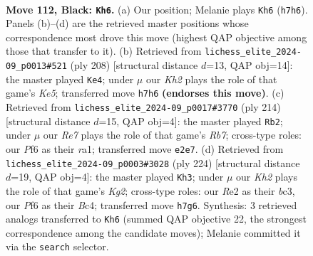 \documentclass[11pt]{article}
\begin{document}
\clearpage

\begin{figure}[p]\centering
\begin{subfigure}{0.46\textwidth}\centering
\resizebox{\linewidth}{!}{%
\newchessgame
\chessboard[
  setfen={8/6pk/5p2/R6p/N6P/6PK/4r3/8 b - - 49 112},
  showmover=false,
  pgfstyle=straightmove, color=movearrow, markmove={h7-h6}
]}
\caption{}
\end{subfigure}\hfill
\begin{subfigure}{0.46\textwidth}\centering
\resizebox{\linewidth}{!}{%
\newchessgame
\chessboard[
  setfen={8/2R5/6pk/4K2p/7P/1r3PP1/8/8 w - - 19 105},
  showmover=false,
  pgfstyle=straightmove, color=movearrow, markmove={e5-e4}
]}
\caption{}
\end{subfigure}
\\[4pt]
\begin{subfigure}{0.46\textwidth}\centering
\resizebox{\linewidth}{!}{%
\newchessgame
\chessboard[
  setfen={8/1R6/6pk/7p/7P/6P1/7K/r7 w - - 52 108},
  showmover=false,
  pgfstyle=straightmove, color=movearrow, markmove={b7-b2}
]}
\caption{}
\end{subfigure}\hfill
\begin{subfigure}{0.46\textwidth}\centering
\resizebox{\linewidth}{!}{%
\newchessgame
\chessboard[
  setfen={8/8/6pk/2p4p/2B2P1P/2b3P1/6K1/8 w - - 48 113},
  showmover=false,
  pgfstyle=straightmove, color=movearrow, markmove={g2-h3}
]}
\caption{}
\end{subfigure}
\caption{\textbf{Move 112, Black: \texttt{Kh6}.} (a) Our position; Melanie plays \texttt{Kh6} (\texttt{h7h6}). Panels (b)--(d) are the retrieved master positions whose correspondence most drove this move (highest QAP objective among those that transfer to it). (b) Retrieved from \texttt{lichess\_elite\_2024-09\_p0013\#521} (ply 208) [structural distance $d$=13, QAP obj=14]: the master played \texttt{Ke4}; under $\mu$ our \emph{Kh2} plays the role of that game's \emph{Ke5}; transferred move \texttt{h7h6} \textbf{(endorses this move)}. (c) Retrieved from \texttt{lichess\_elite\_2024-09\_p0017\#3770} (ply 214) [structural distance $d$=15, QAP obj=4]: the master played \texttt{Rb2}; under $\mu$ our \emph{Re7} plays the role of that game's \emph{Rb7}; cross-type roles: our \emph{P}f6 as their \emph{r}a1; transferred move \texttt{e2e7}. (d) Retrieved from \texttt{lichess\_elite\_2024-09\_p0003\#3028} (ply 224) [structural distance $d$=19, QAP obj=4]: the master played \texttt{Kh3}; under $\mu$ our \emph{Kh2} plays the role of that game's \emph{Kg2}; cross-type roles: our \emph{R}e2 as their \emph{b}c3, our \emph{P}f6 as their \emph{B}c4; transferred move \texttt{h7g6}. Synthesis: 3 retrieved analogs transferred to \texttt{Kh6} (summed QAP objective 22, the strongest correspondence among the candidate moves); Melanie committed it via the \texttt{search} selector.}
\label{fig:thought-m223}
\end{figure}
\end{document}
